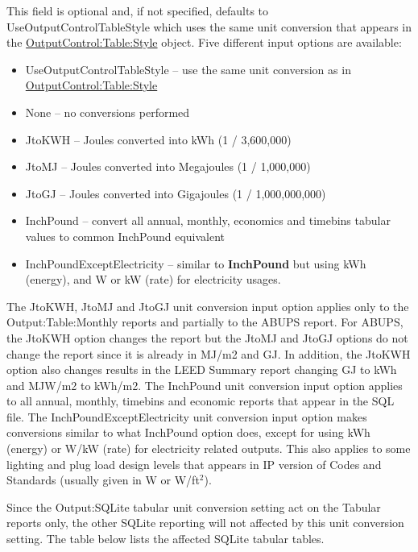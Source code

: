 This field is optional and, if not specified, defaults to UseOutputControlTableStyle which uses the same unit conversion that appears in the   \hyperref[outputcontroltablestyle]{OutputControl:Table:Style}
 object. Five different input options are available:

\begin{itemize}
\item 
UseOutputControlTableStyle -- use the same unit conversion as in \hyperref[outputcontroltablestyle]{OutputControl:Table:Style}

\item 
None -- no conversions performed
\item 
JtoKWH -- Joules converted into kWh (1 / 3,600,000)
\item 
JtoMJ -- Joules converted into Megajoules (1 / 1,000,000)
\item
JtoGJ -- Joules converted into Gigajoules (1 / 1,000,000,000)
\item 
InchPound -- convert all annual, monthly, economics and timebins tabular values to common InchPound equivalent
\item 
InchPoundExceptElectricity -- similar to \textbf{InchPound} but using kWh (energy), and W or kW (rate) for electricity usages.
\end{itemize}

The JtoKWH, JtoMJ and JtoGJ unit conversion input option applies only to the Output:Table:Monthly reports and partially to the ABUPS report. For ABUPS, the JtoKWH option changes the report but the JtoMJ and JtoGJ options do not change the report since it is already in MJ/m2 and GJ. In addition, the JtoKWH option also changes results in the LEED Summary report changing GJ to kWh and MJW/m2 to kWh/m2. The InchPound unit conversion input option applies to all annual, monthly, timebins and economic reports that appear in the SQL file. The InchPoundExceptElectricity unit conversion input option makes conversions similar to what InchPound option does, except for using kWh (energy) or W/kW (rate) for electricity related outputs. This also applies to some lighting and plug load design levels that appears in IP version of Codes and Standards (usually given in W or W/ft$^2$).

Since the Output:SQLite tabular unit conversion setting act on the Tabular reports only, the other SQLite reporting will not affected by this unit conversion setting. The table below lists the affected SQLite tabular tables. 
 
